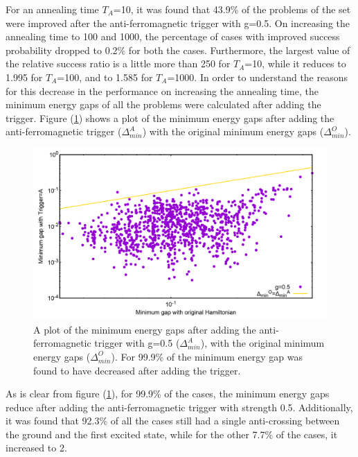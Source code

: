 \documentclass[12]{article}
\begin{document}
For an annealing time $T_A$=10, it was found that 43.9\% of the problems of the set were improved after the anti-ferromagnetic trigger with g=0.5. On increasing the annealing time to 100 and 1000, the percentage of cases with improved success probability dropped to 0.2\% for both the cases. Furthermore, the largest value of the relative success ratio is a little more than 250 for $T_A$=10, while it reduces to 1.995 for $T_A$=100, and to 1.585 for $T_A$=1000. In order to understand the reasons for this decrease in the performance on increasing the annealing time, the minimum energy gaps of all the problems were calculated after adding the trigger. Figure (\ref{fig:a13}) shows a plot of the minimum energy gaps after adding the anti-ferromagnetic trigger ($\Delta_{min}^A$) with the original minimum energy gaps ($\Delta_{min}^O$).
\begin{figure}[H]
\centering 
\includegraphics[scale=0.24]{MinGap_A_g0.png}
\caption{A plot of the minimum energy gaps after adding the anti-ferromagnetic trigger with g=0.5 ($\Delta_{min}^A$), with the original minimum energy gaps ($\Delta_{min}^O$). For 99.9\% of the minimum energy gap was found to have decreased after adding the trigger.}
\label{fig:a13}
\end{figure}
As is clear from figure (\ref{fig:a13}), for 99.9\% of the cases, the minimum energy gaps reduce after adding the anti-ferromagnetic trigger with strength 0.5. Additionally, it was found that 92.3\% of all the cases still had a single anti-crossing between the ground and the first excited state, while for the other 7.7\% of the cases, it increased to 2.
\end{document}
